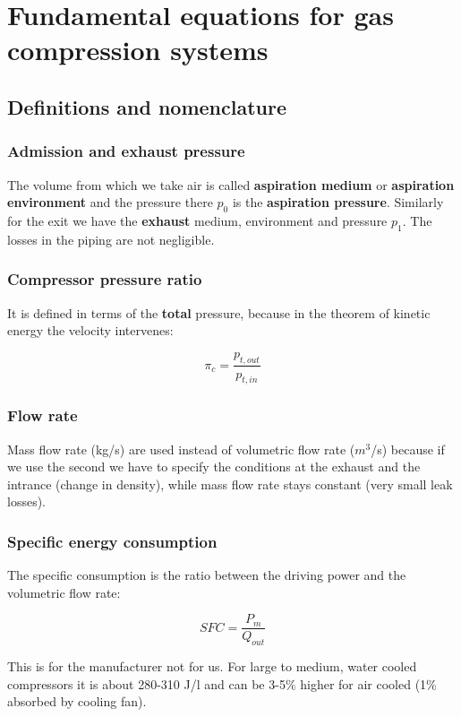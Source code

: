 \section{Fundamental equations for gas compression systems}
\subsection{Definitions and nomenclature}
\subsubsection{Admission and exhaust pressure}
The volume from which we take air is called \textbf{aspiration medium} or \textbf{aspiration environment} and the pressure there $p_0$ is the \textbf{aspiration pressure}. Similarly for the exit we have the \textbf{exhaust} medium, environment and pressure $p_1$. The losses in the piping are not negligible. 

\subsubsection{Compressor pressure ratio}
It is defined in terms of the \textbf{total} pressure, because in the theorem of kinetic energy the velocity intervenes: 

\begin{equation}
\pi _c = \frac{p_{t, out}}{p_{t, in}}
\end{equation}

\subsubsection{Flow rate}
Mass flow rate (kg/s) are used instead of volumetric flow rate ($m^3$/s) because if we use the second we have to specify the conditions at the exhaust and the intrance (change in density), while mass flow rate stays constant (very small leak losses).

\subsubsection{Specific energy consumption}
The specific consumption is the ratio between the driving power and the volumetric flow rate: 

\begin{equation}
SFC = \frac{P_m}{Q_{out}}
\end{equation} 

This is for the manufacturer not for us. For large to medium, water cooled compressors it is about 280-310 J/l and can be 3-5\% higher for air cooled (1\% absorbed by cooling fan). 

